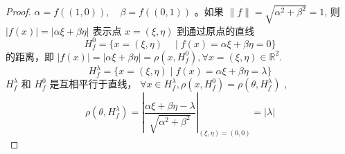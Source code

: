 \documentclass[lang=cn,newtx,10pt,scheme=chinese,thmcnt=chapter]{elegantbook}
\begin{document}
\begin{proof}
$\alpha=f\left((1,0)\right), \quad \beta=f\left((0,1)\right)$ 。如果 $\|f\|=\sqrt{\alpha^2+\beta^2}=1$, 则$|f(x)|=|\alpha \xi+\beta \eta|$ 表示点 $x=(\xi, \eta)$ 到通过原点的直线
\begin{equation*}
H_f^0=\{x=(\xi, \eta) \quad \mid f(x)=\alpha \xi+\beta \eta=0\}
\end{equation*}
的距离，即 $|f(x)|=|\alpha \xi+\beta \eta|=\rho\left(x, H_f^0\right), \forall x=(\xi, \eta) \in \mathbb{R} ^2$.
\begin{equation*}
H_f^\lambda=\{x=(\xi, \eta) \mid f(x)=\alpha \xi+\beta \eta=\lambda\}
\end{equation*}
$H_f^\lambda$ 和 $H_f^0$ 是互相平行于直线， $\forall x \in H_f^\lambda, \rho\left(x, H_f^0\right)=\rho\left(\theta, H_f^\lambda\right)$ ,
\begin{equation*}
\rho\left(\theta, H_f^\lambda\right)=\left|\frac{\alpha \xi+\beta \eta-\lambda}{\sqrt{\alpha^2+\beta^2}}\right|_{(\xi, \eta)=(0,0)}=|\lambda|
\end{equation*}    
\end{proof}
\end{document}
